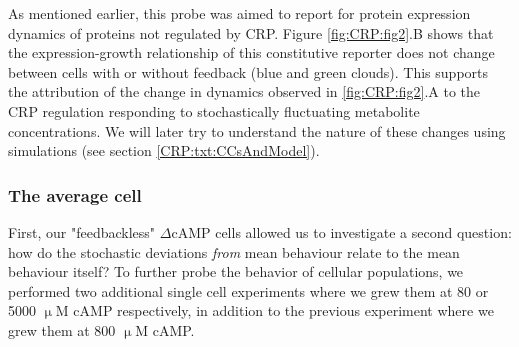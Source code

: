 %
As mentioned earlier, this probe was aimed to report for protein expression dynamics of proteins not regulated by CRP.
%
Figure \ref{fig:CRP:fig2}.B shows that the expression-growth relationship of this constitutive reporter does not change between cells with or without feedback (blue and green clouds).
This supports the attribution of the change in dynamics observed in \ref{fig:CRP:fig2}.A to the CRP regulation responding to stochastically fluctuating metabolite concentrations.
%
We will later try to understand the nature of these changes using simulations (see section \ref{CRP:txt:CCsAndModel}).

\subsubsection{The average cell}

First, 
our "feedbackless" $\Delta$cAMP cells allowed us to investigate a second question:
how do the stochastic deviations \textit{from} mean behaviour relate to the mean behaviour itself?
%
To further probe the behavior of cellular populations, 
we performed two additional single cell experiments where 
we grew them at 80 or 5000 $\upmu$M cAMP respectively,
in addition to the previous experiment where we grew them at 800 $\upmu$M cAMP.
%


